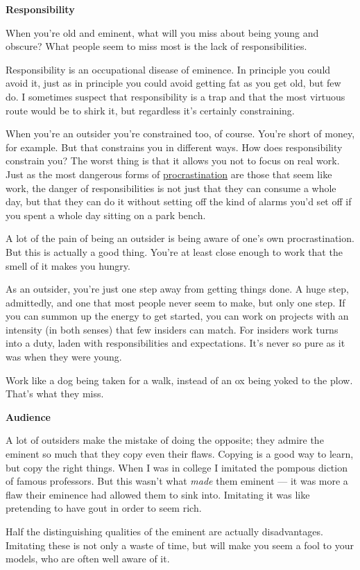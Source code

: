 \documentclass[12pt]{book}
\begin{document}
\textbf{Responsibility}

When you're old and eminent, what will you miss about being young and
obscure? What people seem to miss most is the lack of responsibilities.

Responsibility is an occupational disease of eminence. In principle you
could avoid it, just as in principle you could avoid getting fat as you
get old, but few do. I sometimes suspect that responsibility is a trap
and that the most virtuous route would be to shirk it, but regardless
it's certainly constraining.

When you're an outsider you're constrained too, of course. You're short
of money, for example. But that constrains you in different ways. How
does responsibility constrain you? The worst thing is that it allows you
not to focus on real work. Just as the most dangerous forms of
\href{procrastination.html}{procrastination} are those that seem like
work, the danger of responsibilities is not just that they can consume a
whole day, but that they can do it without setting off the kind of
alarms you'd set off if you spent a whole day sitting on a park bench.

A lot of the pain of being an outsider is being aware of one's own
procrastination. But this is actually a good thing. You're at least
close enough to work that the smell of it makes you hungry.

As an outsider, you're just one step away from getting things done. A
huge step, admittedly, and one that most people never seem to make, but
only one step. If you can summon up the energy to get started, you can
work on projects with an intensity (in both senses) that few insiders
can match. For insiders work turns into a duty, laden with
responsibilities and expectations. It's never so pure as it was when
they were young.

Work like a dog being taken for a walk, instead of an ox being yoked to
the plow. That's what they miss.

\textbf{Audience}

A lot of outsiders make the mistake of doing the opposite; they admire
the eminent so much that they copy even their flaws. Copying is a good
way to learn, but copy the right things. When I was in college I
imitated the pompous diction of famous professors. But this wasn't what
\emph{made} them eminent --- it was more a flaw their eminence had
allowed them to sink into. Imitating it was like pretending to have gout
in order to seem rich.

Half the distinguishing qualities of the eminent are actually
disadvantages. Imitating these is not only a waste of time, but will
make you seem a fool to your models, who are often well aware of it.
\end{document}
